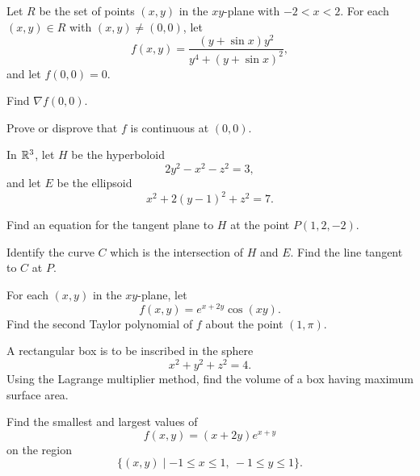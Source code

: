 \begin{problem}
Let $R$ be the set of points $(x, y)$ in the $xy$-plane with $-2<x<2$. For each $(x, y)\in R$ with $(x, y)\ne(0, 0)$, let
\[
f(x, y)=\frac{(y+\sin x)y^2}{y^4+(y+\sin x)^2},
\]
and let $f(0, 0)=0$.
\begin{problemsubparts}
\item Find $\nabla f(0, 0)$.
\item Prove or disprove that $f$ is continuous at $(0, 0)$.
\end{problemsubparts}
\end{problem}

\begin{problem}
In $\mathbb{R}^3$, let $H$ be the hyperboloid
\[
2y^2-x^2-z^2=3,
\]
and let $E$ be the ellipsoid
\[
x^2+2(y-1)^2+z^2=7.
\]
\begin{problemsubparts}
\item Find an equation for the tangent plane to $H$ at the point $P(1, 2, -2)$.
\item Identify the curve $C$ which is the intersection of $H$ and $E$. Find the line tangent to $C$ at $P$.
\end{problemsubparts}
\end{problem}

\begin{problem}
For each $(x, y)$ in the $xy$-plane, let
\[
f(x, y)=e^{x+2y}\cos(xy).
\]
Find the second Taylor polynomial of $f$ about the point $(1, \pi)$.
\end{problem}

\begin{problem}
A rectangular box is to be inscribed in the sphere
\[
x^2+y^2+z^2=4.
\]
Using the Lagrange multiplier method, find the volume of a box having maximum surface area.
\end{problem}

\begin{problem}
Find the smallest and largest values of
\[
f(x, y)=(x+2y)e^{x+y}
\]
on the region
\[
\{(x, y)\mid -1\le x\le1, \ -1\le y\le1\}.
\]
\end{problem}

